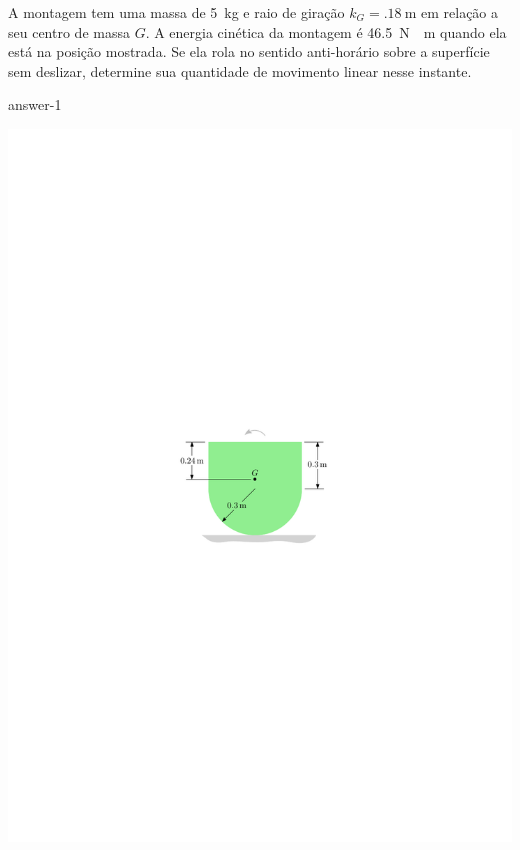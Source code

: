\item A montagem tem uma massa de \SI{5}{\kilogram} e raio de giração $k_{G}=\SI{.18}{\meter}$ em relação a seu centro de massa $G$. A energia cinética da montagem é \SI{46.5}{\newton\cdot\meter} quando ela está na posição mostrada. Se ela rola no sentido anti-horário sobre a superfície sem deslizar, determine sua quantidade de movimento linear nesse instante.

{answer-1}

\vspace{-.8cm}
\begin{flushright}
	\includegraphics[scale=1.2]{../../images/draw_0_9}
\end{flushright}